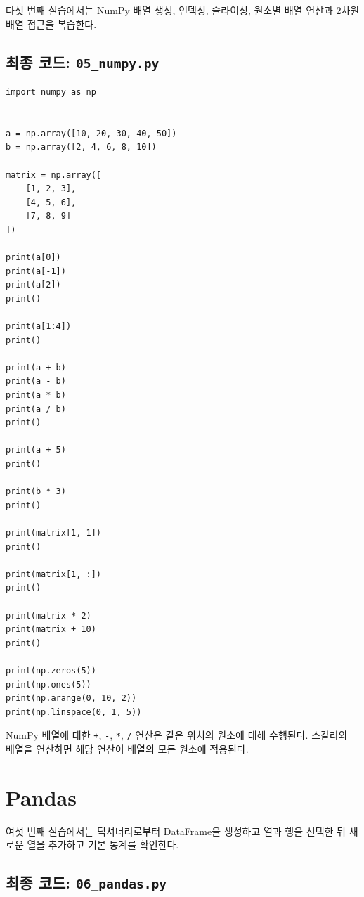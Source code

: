 \documentclass[11pt,a4paper]{article}
\begin{document}
다섯 번째 실습에서는 NumPy 배열 생성, 인덱싱, 슬라이싱, 원소별 배열 연산과 2차원 배열 접근을 복습한다.

\subsection{최종 코드: \texttt{05\_numpy.py}}

\begin{lstlisting}
import numpy as np


a = np.array([10, 20, 30, 40, 50])
b = np.array([2, 4, 6, 8, 10])

matrix = np.array([
    [1, 2, 3],
    [4, 5, 6],
    [7, 8, 9]
])

print(a[0])
print(a[-1])
print(a[2])
print()

print(a[1:4])
print()

print(a + b)
print(a - b)
print(a * b)
print(a / b)
print()

print(a + 5)
print()

print(b * 3)
print()

print(matrix[1, 1])
print()

print(matrix[1, :])
print()

print(matrix * 2)
print(matrix + 10)
print()

print(np.zeros(5))
print(np.ones(5))
print(np.arange(0, 10, 2))
print(np.linspace(0, 1, 5))
\end{lstlisting}

\begin{importantbox}
NumPy 배열에 대한 \texttt{+}, \texttt{-}, \texttt{*}, \texttt{/} 연산은 같은 위치의 원소에 대해 수행된다.
스칼라와 배열을 연산하면 해당 연산이 배열의 모든 원소에 적용된다.
\end{importantbox}

\section{Pandas}

여섯 번째 실습에서는 딕셔너리로부터 DataFrame을 생성하고 열과 행을 선택한 뒤 새로운 열을 추가하고 기본 통계를 확인한다.

\subsection{최종 코드: \texttt{06\_pandas.py}}
\end{document}

